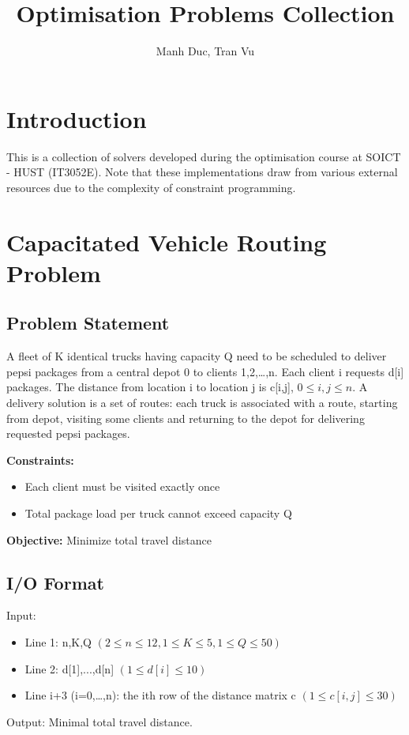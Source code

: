 \documentclass{article}
\newcommand{\subtitle}[1]{%
  \posttitle{%
    \par\end{center}
    \begin{center}\large#1\end{center}}%
}
\begin{document}
\title{Optimisation Problems Collection}
\subtitle{SOICT - HUST (IT3052E)}
\author{Manh Duc, Tran Vu}
\date{}
\maketitle
\pagebreak
\tableofcontents
\pagebreak
\section{Introduction}
This is a collection of solvers developed during the optimisation course at SOICT - HUST (IT3052E). Note that these implementations draw from various external resources due to the complexity of constraint programming.

\section{Capacitated Vehicle Routing Problem}

\subsection{Problem Statement}
A fleet of K identical trucks having capacity Q need to be scheduled to deliver pepsi packages from a central depot 0 to clients 1,2,…,n. Each client i requests d[i] packages. The distance from location i to location j is c[i,j], $0 \leq i,j \leq n$. A delivery solution is a set of routes: each truck is associated with a route, starting from depot, visiting some clients and returning to the depot for delivering requested pepsi packages.

\textbf{Constraints:}

\begin{itemize}
    \item Each client must be visited exactly once
    \item Total package load per truck cannot exceed capacity Q
\end{itemize}

\textbf{Objective:} Minimize total travel distance

\subsection{I/O Format}
Input:
\begin{itemize}
    \item Line 1: n,K,Q $(2\le n\le 12,1\le K\le 5,1\le Q\le50)$
    \item Line 2: d[1],...,d[n] $(1\le d[i]\le 10)$
    \item Line i+3 (i=0,…,n): the ith row of the distance matrix c $(1\le c[i,j]\le 30)$
\end{itemize}
Output: Minimal total travel distance.
\end{document}
